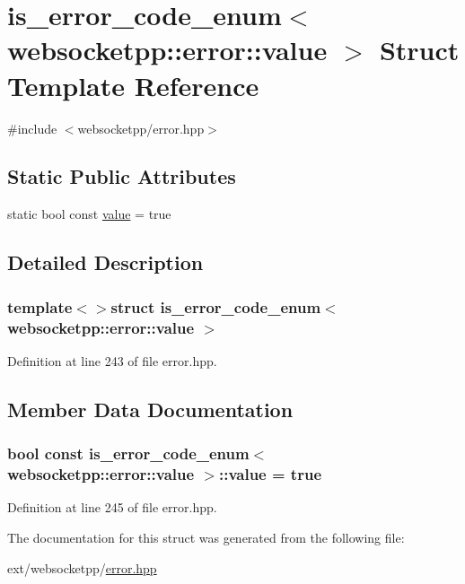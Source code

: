 \hypertarget{structis__error__code__enum_3_01websocketpp_1_1error_1_1value_01_4}{}\section{is\+\_\+error\+\_\+code\+\_\+enum$<$ websocketpp\+:\+:error\+:\+:value $>$ Struct Template Reference}
\label{structis__error__code__enum_3_01websocketpp_1_1error_1_1value_01_4}


{\ttfamily \#include $<$websocketpp/error.\+hpp$>$}

\subsection*{Static Public Attributes}
\begin{DoxyCompactItemize}
\item 
static bool const \hyperlink{structis__error__code__enum_3_01websocketpp_1_1error_1_1value_01_4_afe39d82e019d6303d21a6438f11fc453}{value} = true
\end{DoxyCompactItemize}


\subsection{Detailed Description}
\subsubsection*{template$<$$>$struct is\+\_\+error\+\_\+code\+\_\+enum$<$ websocketpp\+::error\+::value $>$}



Definition at line 243 of file error.\+hpp.



\subsection{Member Data Documentation}
\hypertarget{structis__error__code__enum_3_01websocketpp_1_1error_1_1value_01_4_afe39d82e019d6303d21a6438f11fc453}{}
\subsubsection[{value}]{\setlength{\rightskip}{0pt plus 5cm}bool const is\+\_\+error\+\_\+code\+\_\+enum$<$ {\bf websocketpp\+::error\+::value} $>$\+::value = true\hspace{0.3cm}{\ttfamily [static]}}\label{structis__error__code__enum_3_01websocketpp_1_1error_1_1value_01_4_afe39d82e019d6303d21a6438f11fc453}


Definition at line 245 of file error.\+hpp.



The documentation for this struct was generated from the following file\+:\begin{DoxyCompactItemize}
\item 
ext/websocketpp/\hyperlink{websocketpp_2error_8hpp}{error.\+hpp}\end{DoxyCompactItemize}
